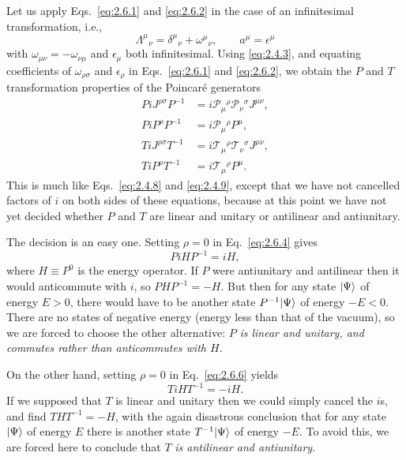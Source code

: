 Let us apply Eqs.~\eqref{eq:2.6.1} and \eqref{eq:2.6.2} in the case of an infinitesimal
transformation, i.e.,
\[
\Lambda^\mu{}_{\nu}=\delta^\mu{}_{\nu}+\omega^\mu{}_{\nu},
\qquad
a^\mu=\epsilon^\mu
\]
with $\omega_{\mu\nu}=-\omega_{\nu\mu}$ and $\epsilon_\mu$ both infinitesimal.
Using \eqref{eq:2.4.3}, and equating coefficients of $\omega_{\rho\sigma}$ and
$\epsilon_\rho$ in Eqs.~\eqref{eq:2.6.1} and \eqref{eq:2.6.2}, we obtain the $P$ and $T$
transformation properties of the Poincar\'e generators
\begin{align}
P iJ^{\rho\sigma}P^{-1}
  &=i\mathcal{P}_\mu{}^\rho\mathcal{P}_\nu{}^\sigma J^{\mu\nu},
  \tag{2.6.3}\label{eq:2.6.3}\\
P iP^\rho P^{-1}
  &=i\mathcal{P}_\mu{}^\rho P^\mu,
  \tag{2.6.4}\label{eq:2.6.4}\\
T iJ^{\rho\sigma}T^{-1}
  &=i\mathcal{T}_\mu{}^\rho\mathcal{T}_\nu{}^\sigma J^{\mu\nu},
  \tag{2.6.5}\label{eq:2.6.5}\\
T iP^\rho T^{-1}
  &=i\mathcal{T}_\mu{}^\rho P^\mu.
  \tag{2.6.6}\label{eq:2.6.6}
\end{align}
This is much like Eqs.~\eqref{eq:2.4.8} and \eqref{eq:2.4.9}, except that we have not cancelled
factors of $i$ on both sides of these equations, because at this point we have
not yet decided whether $P$ and $T$ are linear and unitary or antilinear and
antiunitary.

The decision is an easy one. Setting $\rho=0$ in Eq.~\eqref{eq:2.6.4} gives
\[
P iH P^{-1}=iH,
\]
where $H\equiv P^0$ is the energy operator. If $P$ were antiunitary and
antilinear then it would anticommute with $i$, so $PHP^{-1}=-H$. But then for
any state $\lvert \Psi\rangle$ of energy $E>0$, there would have to be another state
$P^{-1}\lvert \Psi\rangle$ of energy $-E<0$. There are no states of negative energy
(energy less than that of the vacuum), so we are forced to choose the other
alternative: $P$ \emph{is linear and unitary, and commutes rather than
anticommutes with $H$}.

On the other hand, setting $\rho=0$ in Eq.~\eqref{eq:2.6.6} yields
\[
T iH T^{-1}=-iH.
\]
If we supposed that $T$ is linear and unitary then we could simply cancel the
$i$s, and find $THT^{-1}=-H$, with the again disastrous conclusion that for
any state $\lvert \Psi\rangle$ of energy $E$ there is another state
$T^{-1}\lvert \Psi\rangle$ of energy $-E$. To avoid this, we are forced here to
conclude that $T$ \emph{is antilinear and antiunitary}.

